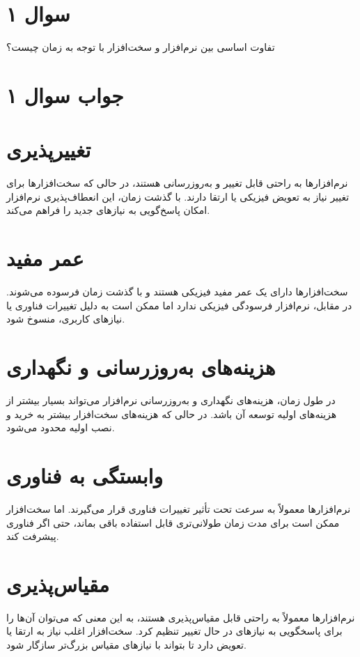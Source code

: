 \section*{سوال ۱}

تفاوت اساسی بین نرم‌افزار و سخت‌افزار با توجه به زمان چیست؟

\section*{جواب سوال ۱}


\section*{تغییرپذیری}
نرم‌افزارها به راحتی قابل تغییر و به‌روزرسانی هستند، در حالی که سخت‌افزارها برای تغییر نیاز به تعویض فیزیکی یا ارتقا دارند. با گذشت زمان، این انعطاف‌پذیری نرم‌افزار امکان پاسخ‌گویی به نیازهای جدید را فراهم می‌کند.

\section*{عمر مفید}
سخت‌افزارها دارای یک عمر مفید فیزیکی هستند و با گذشت زمان فرسوده می‌شوند. در مقابل، نرم‌افزار فرسودگی فیزیکی ندارد اما ممکن است به دلیل تغییرات فناوری یا نیازهای کاربری، منسوخ شود.

\section*{هزینه‌های به‌روزرسانی و نگهداری}
در طول زمان، هزینه‌های نگهداری و به‌روزرسانی نرم‌افزار می‌تواند بسیار بیشتر از هزینه‌های اولیه توسعه آن باشد. در حالی که هزینه‌های سخت‌افزار بیشتر به خرید و نصب اولیه محدود می‌شود.

\section*{وابستگی به فناوری}
نرم‌افزارها معمولاً به سرعت تحت تأثیر تغییرات فناوری قرار می‌گیرند. اما سخت‌افزار ممکن است برای مدت زمان طولانی‌تری قابل استفاده باقی بماند، حتی اگر فناوری پیشرفت کند.

\section*{مقیاس‌پذیری}
نرم‌افزارها معمولاً به راحتی قابل مقیاس‌پذیری هستند، به این معنی که می‌توان آن‌ها را برای پاسخگویی به نیازهای در حال تغییر تنظیم کرد. سخت‌افزار اغلب نیاز به ارتقا یا تعویض دارد تا بتواند با نیازهای مقیاس بزرگ‌تر سازگار شود.